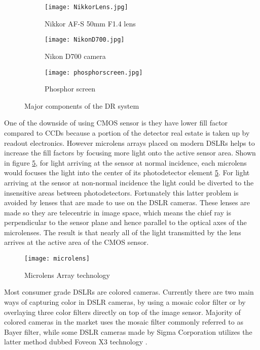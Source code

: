 \begin{figure}[ht]
	\begin{subfigure}[b]{0.3\linewidth}
		\centering
		\texttt{[image: NikkorLens.jpg]}
		\caption{Nikkor AF-S 50mm F1.4 lens}
		\label{fig:nikonlens}
	\end{subfigure}
	\hspace{0.2cm}
	\begin{subfigure}[b]{0.3\linewidth}
		\centering
		\texttt{[image: NikonD700.jpg]}
		\caption{Nikon D700 camera}
		\label{fig:nikoncamera}
	\end{subfigure}
	\hspace{0.2cm}
	\begin{subfigure}[b]{0.3\linewidth}
		\texttt{[image: phosphorscreen.jpg]}
		\caption{Phosphor screen}
		\label{fig:phosphorscreen}
	\end{subfigure}
\caption{Major components of the DR system}
\label{fig:DRcomponents}
\end{figure}

One of the downside of using CMOS sensor is they have lower fill factor compared to CCDs because a portion of the detector real estate is taken up by readout electronics.  However microlens arrays placed on modern DSLRs helps to increase the fill factors by focusing more light onto the active sensor area.  Shown in figure \ref{fig:microlensarray}, for light arriving at the sensor at normal incidence, each microlens would focuses the light into the center of its photodetector element \ref{fig:microlensarray}.  For light arriving at the sensor at non-normal incidence the light could be diverted to the insensitive areas between photodetectors.  Fortunately this latter problem is avoided by lenses that are made to use on the DSLR cameras.  These lenses are made so they are telecentric in image space, which means the chief ray is perpendicular to the sensor plane and hence parallel to the optical axes of the microlenses.  The result is that nearly all of the light transmitted by the lens arrives at the active area of the CMOS sensor.

\begin{figure}
\centering
\texttt{[image: microlens]}
\caption{Microlens Array technology}
\label{fig:microlensarray}
\end{figure}

Most consumer grade DSLRs are colored cameras.  Currently there are two main ways of capturing color in DSLR cameras, by using a mosaic color filter or by overlaying three color filters directly on top of the image sensor.  Majority of colored cameras in the market uses the mosaic filter commonly referred to as Bayer filter, while some DSLR cameras made by Sigma Corporation utilizes the latter method dubbed Foveon X3 technology \cite{foveon}.  

